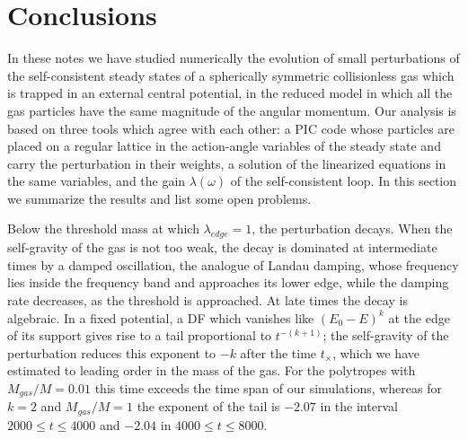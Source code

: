 \section{Conclusions}
\label{Sec:Conclusions}

In these notes we have studied numerically the evolution of small perturbations of the self-consistent steady states of a spherically symmetric collisionless gas which is trapped in an external central potential, in the reduced model in which all the gas particles have the same magnitude of the angular momentum. Our analysis is based on three tools which agree with each other: a PIC code whose particles are placed on a regular lattice in the action-angle variables of the steady state and carry the perturbation in their weights, a solution of the linearized equations in the same variables, and the gain $\lambda(\omega)$ of the self-consistent loop. In this section we summarize the results and list some open problems.

Below the threshold mass at which $\lambda_{edge} = 1$, the perturbation decays. When the self-gravity of the gas is not too weak, the decay is dominated at intermediate times by a damped oscillation, the analogue of Landau damping, whose frequency lies inside the frequency band and approaches its lower edge, while the damping rate decreases, as the threshold is approached. At late times the decay is algebraic. In a fixed potential, a DF which vanishes like $(E_0 - E)^k$ at the edge of its support gives rise to a tail proportional to $t^{-(k+1)}$; the self-gravity of the perturbation reduces this exponent to $-k$ after the time $t_\times$, which we have estimated to leading order in the mass of the gas. For the polytropes with $M_{gas}/M = 0.01$ this time exceeds the time span of our simulations, whereas for $k = 2$ and $M_{gas}/M = 1$ the exponent of the tail is $-2.07$ in the interval $2000\leq t\leq 4000$ and $-2.04$ in $4000\leq t\leq 8000$.

